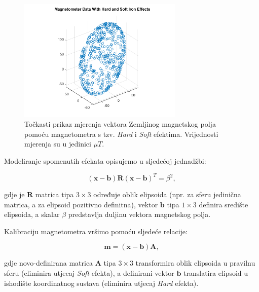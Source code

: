 \documentclass[times, utf8, diplomski, numeric]{templates/template}
\begin{document}
{{{{                \begin{figure}[h!]
                \centering
                \includegraphics[width=0.7\textwidth]{images/mag_hard_soft.png}
                \caption{Točkasti prikaz mjerenja vektora Zemljinog magnetskog polja pomoću magnetometra s tzv. \emph{Hard} i \emph{Soft} efektima. Vrijednosti mjerenja su u jedinici $\mu T$.}
                \label{fig:mag_hard_soft}
                \end{figure}

                Modeliranje spomenutih efekata opisujemo u sljedećoj jednadžbi:

                \begin{equation}
                    (\boldsymbol{x} - \boldsymbol{b}) \boldsymbol{R} (\boldsymbol{x} - \boldsymbol{b})^T = \beta^2,
                \end{equation}

                gdje je $\boldsymbol{R}$ matrica tipa $3\times3$ određuje oblik elipsoida (npr. za sferu jedinična matrica, a za elipsoid pozitivno definitna), vektor $\boldsymbol{b}$ tipa $1\times3$ definira središte elipsoida, a skalar $\beta$ predstavlja duljinu vektora magnetskog polja. 

                Kalibraciju magnetometra vršimo pomoću sljedeće relacije:

                \begin{equation}
                    \boldsymbol{m} = (\boldsymbol{x} - \boldsymbol{b}) \boldsymbol{A},
                \end{equation}

                gdje novo-definirana matrica $\boldsymbol{A}$ tipa $3\times3$ transformira oblik elipsoida u pravilnu sferu (eliminira utjecaj \emph{Soft} efekta), a definirani vektor $\boldsymbol{b}$ translatira elipsoid u ishodište koordinatnog sustava (eliminira utjecaj \emph{Hard} efekta).

}}}}
\end{document}
